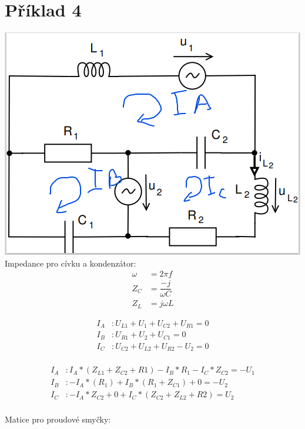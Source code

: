 \section{Příklad 4}

\includegraphics[scale=0.5,keepaspectratio]{picturesFor4Uloha/1.PNG} \\ 

Impedance pro cívku a kondenzátor:
\begin{align*}
	\omega &= 2\pi f \\
	Z_C &= \dfrac{-j}{\omega C}\\
	Z_L &=  j\omega L
\end{align*}

\begin{align*}
    I_A &:  U_{L1} + U_1 + U_{C2} + U_{R1} = 0 \\
    I_B &:  U_{R1} + U_2 + U_{C1} = 0 \\
    I_C &:  U_{C2} + U_{L2} + U_{R2} - U_2 = 0 \\
\end{align*}

\begin{align*}
    I_A &:  I_A * (Z_{L1} + Z_{C2} + R1) - I_B * R_1 - I_C * Z_{C2} = -U_1 \\
    I_B &:  -I_A * (R_1) + I_B * (R_1  + Z_{C1}) + 0 = -U_2 \\
    I_C &:  -I_A * Z_{C2} + 0 + I_C * (Z_{C2} + Z_{L2} + R2)  = U_2 \\
\end{align*}

Matice pro proudové smyčky: 

